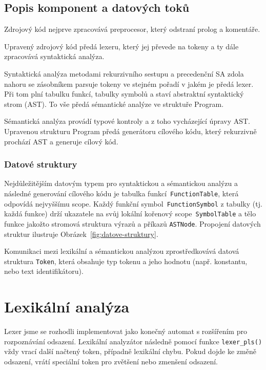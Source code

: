 \documentclass[a4paper,11pt]{article}
\begin{document}
\subsection{Popis komponent a datových toků}

Zdrojový kód nejprve zpracovává preprocesor, který odstraní prolog a komentáře.

Upravený zdrojový kód předá lexeru, který jej převede na tokeny a ty dále zpracovává syntaktická analýza.

Syntaktická analýza metodami rekurzivního sestupu a precedenční SA zdola nahoru se zásobníkem parsuje tokeny ve stejném pořadí v jakém je předá lexer. Při tom plní tabulku funkcí, tabulky symbolů a staví abstraktní syntaktický strom (AST). To vše předá sémantické analýze ve struktuře Program.

Sémantická analýza provádí typové kontroly a z toho vycházející úpravy AST. Upravenou strukturu Program předá generátoru cílového kódu, který rekurzivně prochází AST a generuje cílový kód.

\subsubsection{Datové struktury}
Nejdůležitějším datovým typem pro syntaktickou a sémantickou analýzu a následné generování cílového kódu je tabulka funkcí~\texttt{FunctionTable}, která odpovídá nejvyššímu scope. Každý funkční symbol~\texttt{FunctionSymbol} z tabulky (tj. každá funkce) drží ukazatele na svůj lokální kořenový scope~\texttt{SymbolTable} a tělo funkce jakožto stromová struktura výrazů a příkazů \texttt{ASTNode}. Propojení datových struktur ilustruje Obrázek~\ref{fig:datove-struktury}.

Komunikaci mezi lexikální a sémantickou analýzou zprostředkovává datová struktura \texttt{Token}, která obsahuje typ tokenu a jeho hodnotu (např. konstantu, nebo text identifikátoru).


\section{Lexikální analýza}
\label{sec:lex}
Lexer jsme se rozhodli implementovat jako konečný automat s rozšířením pro rozpoznávání odsazení. Lexikální analyzátor následně pomocí funkce \texttt{lexer\_pls()} vždy vrací další načtený token, případně lexikální chybu. Pokud dojde ke změně odsazení, vrátí speciální token pro zvětšení nebo zmenšení odsazení.
\end{document}
